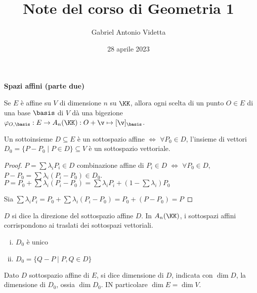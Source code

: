 \documentclass[11pt]{article}
\title{\textbf{Note del corso di Geometria 1}}
\author{Gabriel Antonio Videtta}
\date{28 aprile 2023}
\begin{document}
	
	\maketitle
	
	\begin{center}
		\Large \textbf{Spazi affini (parte due)}
	\end{center}

	
	Se $E$ è affine su $V$ di dimensione $n$ su $\KK$, allora ogni scelta
	di un punto $O \in E$ di una base $\basis$ di $V$ dà una bigezione
	$\varphi_{O, \basis} : E \to A_n(\KK) : O + \v \mapsto [\v]_{\basis}$. \\
	
	
	\begin{proposition}
		Un sottoinsieme $D \subseteq E$ è un sottospazio affine
		$\iff$ $\forall P_0 \in D$, l'insieme di vettori $D_0 = \{P - P_0 \mid P \in D\} \subseteq V$ è un sottospazio vettoriale. 
	\end{proposition}

	\begin{proof}
		$P = \sum \lambda_i P_i \in D$ combinazione affine
		di $P_i \in D$ $\iff$ $\forall P_0 \in D$, $P-P_0 = \sum \lambda_i (P_i - P_0) \in D_0$. \\
		
		\rightproof $P = P_0 + \sum \lambda_i (P_i - P_0) = \sum \lambda_i P_i + (1- \sum \lambda_i) P_0$ %
		
		\leftproof Sia $\sum \lambda_i P_i = P_0 + \sum \lambda_i (P_i - P_0) = P_0 + (P - P_0) = P$ %
	\end{proof}

	$D$ si dice la direzione del sottospazio affine $D$. In $A_n(\KK)$,
	i sottospazi affini corrispondono ai traslati dei sottospazi vettoriali.
	
	\begin{exercise}\nl
		\begin{enumerate}[(i)]
			\item $D_0$ è unico
			\item $D_0 = \{ Q - P \mid P, Q \in D \}$
		\end{enumerate}
	\end{exercise}

	\begin{definition} 
		Dato $D$ sottospazio affine di $E$, si dice dimensione di $D$,
		indicata con $\dim D$, la dimensione di $D_0$, ossia
		$\dim D_0$. IN particolare $\dim E = \dim V$.
	\end{definition}
\end{document}

